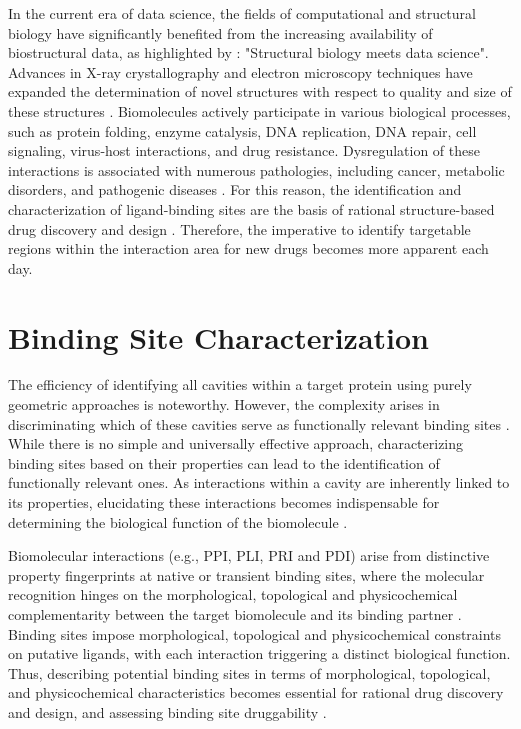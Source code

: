 \documentclass[Ingles]{phdthesis}
\def\eg{e.g.\onedot}
\begin{document}
In the current era of data science, the fields of computational and structural biology have significantly benefited from the increasing availability of biostructural data, as highlighted by \cite{mura2018}: "Structural biology meets data science". Advances in X-ray crystallography and electron microscopy techniques have expanded the determination of novel structures with respect to quality and size of these structures \cite{burley2018}. Biomolecules actively participate in various biological processes, such as protein folding, enzyme catalysis, DNA replication, DNA repair, cell signaling, virus-host interactions, and drug resistance. Dysregulation of these interactions is associated with numerous pathologies, including cancer, metabolic disorders, and pathogenic diseases \cite{scott2013}. For this reason, the identification and characterization of ligand-binding sites are the basis of rational structure-based drug discovery and design \cite{sotriffer2002,henrich2010}. Therefore, the imperative to identify targetable regions within the interaction area for new drugs becomes more apparent each day.

\section{Binding Site Characterization \label{sec:biomolecular-characterization}}


The efficiency of identifying all cavities within a target protein using purely geometric approaches is noteworthy. However, the complexity arises in discriminating which of these cavities serve as functionally relevant binding sites \cite{sotriffer2002,henrich2010,liang1998,guerra2019}. While there is no simple and universally effective approach, characterizing binding sites based on their properties can lead to the identification of functionally relevant ones. As interactions within a cavity are inherently linked to its properties, elucidating these interactions becomes indispensable for determining the biological function of the biomolecule \cite{sotriffer2002,henrich2010}. 

Biomolecular interactions (\eg, PPI, PLI, PRI and PDI) arise from distinctive property fingerprints at native or transient binding sites, where the molecular recognition hinges on the morphological, topological and physicochemical complementarity between the target biomolecule and its binding partner \cite{sotriffer2002,henrich2010,guerra2019,krone2016}. Binding sites impose morphological, topological and physicochemical constraints on putative ligands, with each interaction triggering a distinct biological function. Thus, describing potential binding sites in terms of morphological, topological, and physicochemical characteristics becomes essential for rational drug discovery and design, and assessing binding site druggability \cite{hubbard1994,liang1998,guerra2019,krone2016}.
\end{document}
